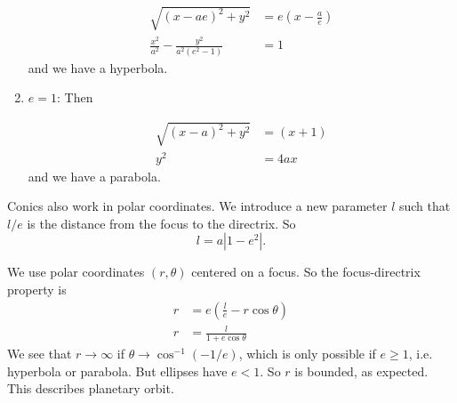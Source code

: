 \documentclass[a4paper]{article}
\begin{document}
\begin{enumerate}
\begin{center}
  \end{center}
  \begin{align*}
    \sqrt{(x - ae)^2 + y^2} &= e\left(x - \frac{a}{e}\right)\\
    \frac{x^2}{a^2} - \frac{y^2}{a^2(e^2 - 1)} &= 1
  \end{align*}
  and we have a hyperbola.
\item $e = 1$: Then
  \begin{center}
  \end{center}
  \begin{align*}
    \sqrt{(x - a)^2 + y^2} &= (x + 1)\\
    y^2 &= 4ax
  \end{align*}
  and we have a parabola.
\end{enumerate}

Conics also work in polar coordinates. We introduce a new parameter $l$ such that $l/e$ is the distance from the focus to the directrix. So
\[
l = a|1 - e^2|.
\]

We use polar coordinates $(r, \theta)$ centered on a focus. So the focus-directrix property is
\begin{align*}
  r &= e\left(\frac{l}{e} - r\cos\theta\right)\\
  r &= \frac{l}{1 + e\cos\theta}
\end{align*}
We see that $r\to \infty$ if $\theta \to \cos^{-1}(-1/e)$, which is only possible if $e\geq 1$, i.e. hyperbola or parabola. But ellipses have $e < 1$. So $r$ is bounded, as expected. This describes planetary orbit.
\end{document}
